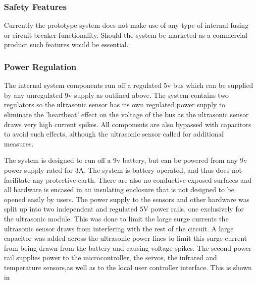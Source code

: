 \documentclass[]{report}
\begin{document}
\subsubsection{Safety Features}
Currently the prototype system does not make use of any type of internal fusing or circuit breaker functionality. Should the system be marketed as a commercial product such features would be essential.

\subsubsection{Power Regulation}
The internal system components run off a regulated 5v bus which can be supplied by any unregulated 9v supply as outlined above. The system contains two regulators so the ultrasonic sensor has its own regulated power supply to eliminate the 'heartbeat' effect on the voltage of the bus as the ultrasonic sensor draws very high current spikes. \newline
All components are also bypassed with capacitors to avoid such effects, although the ultrasonic sensor called for additional measures.

The system is designed to run off a 9v battery, but can be powered from any 9v power supply rated for 3A. The system is battery operated, and thus does not facilitate any protective earth. There are also no conductive exposed surfaces and all hardware is encased in an insulating enclosure that is not designed to be opened easily by users. \newline
The power supply to the sensors and other hardware was split up into two independent and regulated 5V power rails, one exclusively for the ultrasonic module. This was done to limit the large surge currents the ultrasonic sensor draws from interfering with the rest of the circuit. A large capacitor was added across the ultrasonic power lines to limit this surge current from being drawn from the battery and causing voltage spikes.\newline
The second power rail supplies power to the microcontroller, the servos, the infrared and temperature sensors,as well as to the local user controller interface. This is shown in \label{PowerBusDiagram}\newline
\end{document}
